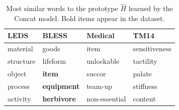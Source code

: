 \documentclass[12pt]{article}
\begin{document}
\begin{table}
\begin{center}
  \begin{small}
  \begin{tabular}{|llll|}
    \hline
    LEDS & BLESS & Medical & TM14\\
    \hline
     material       &      goods             &     item           &      sensitiveness          \\
     structure      &      lifeform          &     unlockable     &      tactility              \\
     object         & {\bf item}             &     succor         &      palate                 \\
     process        & {\bf equipment}        &     team-up        &      stiffness              \\
     activity       & {\bf herbivore}        &     non-essential  &      content                \\
    \hline
  \end{tabular}
  \end{small}
\end{center}
\caption{Most similar words to the prototype $\hat H$ learned by the Concat model. Bold items
appear in the dataset.}
\label{tab:wordsim}
\end{table}
\end{document}

